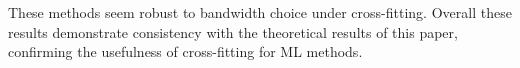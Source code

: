 \documentclass[lettersize, 12pt]{article}
\begin{document}


These methods seem  robust to bandwidth choice under cross-fitting.
Overall these results demonstrate consistency with the theoretical results of this paper, confirming the usefulness of cross-fitting for ML methods.


\end{document}
